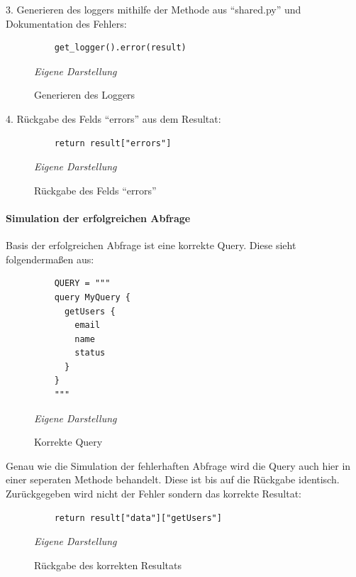 3. Generieren des loggers mithilfe der Methode aus ``shared.py'' und Dokumentation des Fehlers:\newline
	\begin{figure}[H]
	\centering
	\begin{minipage}[t]{.7\textwidth} %
	\caption{Generieren des Loggers} %
	\begin{verbatim}
	get_logger().error(result)
	\end{verbatim}
	
	\textit{Eigene Darstellung} %
	\label{fig:loggerGenerierung}
	\end{minipage}
	\end{figure}
4. Rückgabe des Felds ``errors'' aus dem Resultat:\newline
	\begin{figure}[H]
	\centering
	\begin{minipage}[t]{.7\textwidth} %
	\caption{Rückgabe des Felds ``errors''} %
	\begin{verbatim}
	return result["errors"]
	\end{verbatim}
	
	\textit{Eigene Darstellung} %
	\label{fig:errorFeldRückgabe}
	\end{minipage}
	\end{figure}
\paragraph{Simulation der erfolgreichen Abfrage}
Basis der erfolgreichen Abfrage ist eine korrekte Query. Diese sieht folgendermaßen aus:\newline
	\begin{figure}[H]
	\centering
	\begin{minipage}[t]{.7\textwidth} %
	\caption{Korrekte Query} %
	\begin{verbatim}
	QUERY = """
	query MyQuery {
	  getUsers {
	    email
	    name
	    status
	  }
	}
	"""
	\end{verbatim}
	
	\textit{Eigene Darstellung} %
	\label{fig:korrekteQuery}
	\end{minipage}
	\end{figure}
Genau wie die Simulation der fehlerhaften Abfrage wird die Query auch hier in einer seperaten Methode behandelt. Diese ist bis auf die Rückgabe identisch. Zurückgegeben wird nicht der Fehler sondern das korrekte Resultat:\newline
	\begin{figure}[H]
	\centering
	\begin{minipage}[t]{.7\textwidth} %
	\caption{Rückgabe des korrekten Resultats} %
	\begin{verbatim}
	return result["data"]["getUsers"]
	\end{verbatim}
	
	\textit{Eigene Darstellung} %
	\label{fig:resultatsRückgabe}
	\end{minipage}
	\end{figure}

